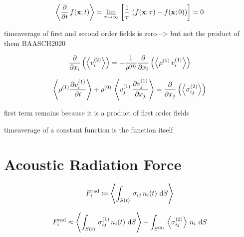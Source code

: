\begin{equation}
  \left\langle \pdv{t}\,f(\vb{x};t) \right\rangle = \lim\limits_{\tau \rightarrow \infty}{\,
    \left[ \frac{1}{\tau}\,\left( f(\vb{x}; \tau) - f(\vb{x}; 0) \right) 
  \right]} = 0
  \label{eq:Th-avg-property}
\end{equation}

timeaverage of first and second order fields is zero --> but not the product of 
them BAASCH2020

\begin{equation}
  \pdv{x_{i}}\left( \left\langle v_{i}^{(2)} \right\rangle \right) = 
  -\frac{1}{\rho^{(0)}} \pdv{x_{i}}\left(\left\langle  
  \rho^{(1)}\,v_{i}^{(1)}  \right\rangle\right)
  \label{eq:Th-avg-massconservatio}
\end{equation}

\begin{equation}
  \left\langle \rho^{(1)} \pdv{  v_{i}^{(1)}  }{t} \right\rangle + 
  \rho^{(0)}\,\left\langle v_{j}^{(1)}\,\pdv{  v_{j}^{(1)}  }{x_{j}} \right\rangle 
  = \pdv{x_{j}}\left( \left\langle \sigma_{ij}^{(2)} \right\rangle \right)
  \label{eq:Th-avg-navier}
\end{equation}

first term remains because it is a product of first order fields

timeaverage of a constant function is the function itself

\section{Acoustic Radiation Force\label{sec:Th-ARF}}

\begin{equation}
  F^{\mathrm{rad}}_{i} \coloneqq
  \left\langle \int_{S(t)}\,\sigma_{ij}\,n_{i}(t)\,\dd{S} \right\rangle
  \label{eq:Th-def-rad}
\end{equation}


\begin{equation}
  F^{\mathrm{rad}}_{i} \approx
  \left\langle \int_{S(t)}\,\sigma_{ij}^{(1)}\,n_{i}(t)\,\dd{S} \right\rangle +
  \int_{S^{(0)}}\,\left\langle \sigma_{ij}^{(2)} \right\rangle\,n_{i}\,\dd{S}
  \label{eq:Th-def-approx-ARF}
\end{equation}


